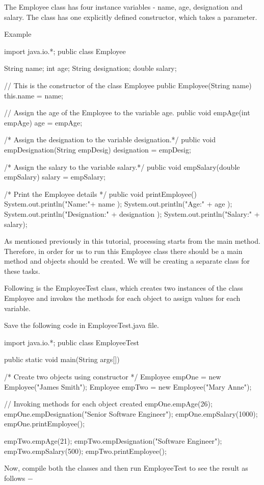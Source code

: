 The Employee class has four instance variables - name, age, designation and salary. The class has one explicitly defined constructor, which takes a parameter.

Example

import java.io.*;
public class Employee {

   String name;
   int age;
   String designation;
   double salary;

   // This is the constructor of the class Employee
   public Employee(String name) {
      this.name = name;
   }

   // Assign the age of the Employee  to the variable age.
   public void empAge(int empAge) {
      age = empAge;
   }

   /* Assign the designation to the variable designation.*/
   public void empDesignation(String empDesig) {
      designation = empDesig;
   }

   /* Assign the salary to the variable salary.*/
   public void empSalary(double empSalary) {
      salary = empSalary;
   }

   /* Print the Employee details */
   public void printEmployee() {
      System.out.println("Name:"+ name );
      System.out.println("Age:" + age );
      System.out.println("Designation:" + designation );
      System.out.println("Salary:" + salary);
   }
}
As mentioned previously in this tutorial, processing starts from the main method. Therefore, in order for us to run this Employee class there should be a main method and objects should be created. We will be creating a separate class for these tasks.

Following is the EmployeeTest class, which creates two instances of the class Employee and invokes the methods for each object to assign values for each variable.

Save the following code in EmployeeTest.java file.

import java.io.*;
public class EmployeeTest {

   public static void main(String args[]) {
      /* Create two objects using constructor */
      Employee empOne = new Employee("James Smith");
      Employee empTwo = new Employee("Mary Anne");

      // Invoking methods for each object created
      empOne.empAge(26);
      empOne.empDesignation("Senior Software Engineer");
      empOne.empSalary(1000);
      empOne.printEmployee();

      empTwo.empAge(21);
      empTwo.empDesignation("Software Engineer");
      empTwo.empSalary(500);
      empTwo.printEmployee();
   }
}
Now, compile both the classes and then run EmployeeTest to see the result as follows −

